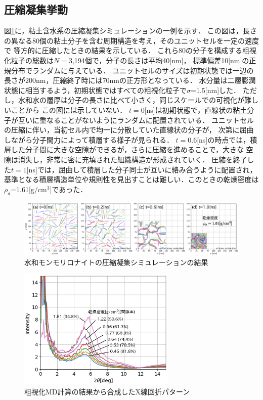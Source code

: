 ﻿\documentclass[11pt,a4j]{jarticle}
\begin{document}
\subsection{圧縮凝集挙動}
図\ref{fig:fig2}に，粘土含水系の圧縮凝集シミュレーションの一例を示す．
この図は，長さの異なる80個の粘土分子を含む周期構造を考え，そのユニットセルを一定の速度で
等方的に圧縮したときの結果を示している．
これら80の分子を構成する粗視化粒子の総数は$N=$3,194個で，分子の長さは平均40[nm]，
標準偏差10[nm]の正規分布でランダムに与えている．
ユニットセルのサイズは初期状態では一辺の長さが200nm，圧縮終了時には70nmの正方形となっている．
水分量は二層膨潤状態に相当するよう，初期状態ではすべての粗視化粒子で$\sigma$=1.5[nm]した．
ただし，水和水の層厚は分子の長さに比べて小さく，同じスケールでの可視化が難しいことから
この図には示していない．
$t=0$[ns]は初期状態で，直線状の粘土分子が互いに重なることがないようにランダムに配置されている．
ユニットセルの圧縮に伴い，当初セル内で均一に分散していた直線状の分子が，
次第に屈曲しながら分子間力によって積層する様子が見られる．
$t=$0.6[ns]の時点では，積層した分子間に大きな空隙ができるが，さらに圧縮を進めることで，大きな
空隙は消失し，非常に密に充填された組織構造が形成されていく．
圧縮を終了した$t=1$[ns]では，屈曲して積層した分子同士が互いに絡み合うように配置され，
基準となる積層構造単位や規則性を見出すことは難しい．このときの乾燥密度は$\rho_d$=1.61[g/cm$^3$]であった．
\begin{figure}[t]
	\begin{center}
	\includegraphics[width=1.0\linewidth]{Figs/revs.eps} 
	\end{center}
	\caption{水和モンモリロナイトの圧縮凝集シミュレーションの結果} 
	\label{fig:fig2}
\end{figure}
\begin{figure}
	\centering
	\includegraphics[keepaspectratio,width=75mm]{Figs/xrd.eps}
	\vspace{-5mm}
	\caption{粗視化MD計算の結果から合成したX線回折パターン}
	\label{fig:fig3}
\end{figure}
\end{document}
